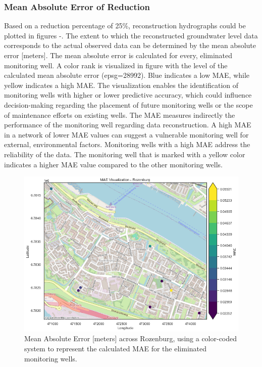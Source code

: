 \subsubsection{Mean Absolute Error of Reduction}
Based on a reduction percentage of 25\%, reconstruction hydrographs could be plotted in figures -. The extent to which the reconstructed groundwater level data corresponds to the actual observed data can be determined by the mean absolute error [meters]. The mean absolute error is calculated for every, eliminated monitoring well. A color rank is visualized in figure  with the level of the calculated mean absolute error (epsg=28992). Blue indicates a low MAE, while yellow indicates a high MAE. The visualization enables the identification of monitoring wells with higher or lower predictive accuracy, which could influence decision-making regarding the placement of future monitoring wells or the scope of maintenance efforts on existing wells. The MAE measures indirectly the performance of the monitoring well regarding data reconstruction. A high MAE in a network of lower MAE values can suggest a vulnerable monitoring well for external, environmental factors. Monitoring wells with a high MAE address the reliability of the data. The monitoring well that is marked with a yellow color indicates a higher MAE value compared to the other monitoring wells. 

\begin{figure}[htbp]
    \centering
    \includegraphics[width=1\linewidth]{frontmatter/Rozenburg-fig/mae25roz.png}
    \caption{Mean Absolute Error [meters] across Rozenburg, using a color-coded system to represent the calculated MAE for the eliminated monitoring wells.}
    \label{maeroz}
\end{figure}

